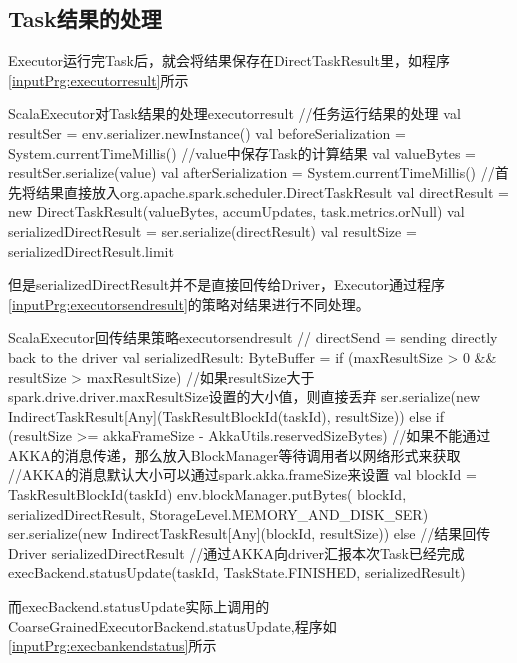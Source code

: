 \subsection{Task结果的处理}
Executor运行完Task后，就会将结果保存在DirectTaskResult里，如程序\ref{inputPrg:executorresult}所示
\begin{codeInput}{Scala}{Executor对Task结果的处理}{executorresult}
//任务运行结果的处理
val resultSer = env.serializer.newInstance()
val beforeSerialization = System.currentTimeMillis()
//value中保存Task的计算结果
val valueBytes = resultSer.serialize(value)
val afterSerialization = System.currentTimeMillis()
//首先将结果直接放入org.apache.spark.scheduler.DirectTaskResult
val directResult = new DirectTaskResult(valueBytes, accumUpdates, task.metrics.orNull)
val serializedDirectResult = ser.serialize(directResult)
val resultSize = serializedDirectResult.limit
\end{codeInput}

但是serializedDirectResult并不是直接回传给Driver，Executor通过程序\ref{inputPrg:executorsendresult}的策略对结果进行不同处理。
\begin{codeInput}{Scala}{Executor回传结果策略}{executorsendresult}
// directSend = sending directly back to the driver
val serializedResult: ByteBuffer = {
if (maxResultSize > 0 && resultSize > maxResultSize) {
  //如果resultSize大于spark.drive.driver.maxResultSize设置的大小值，则直接丢弃
  ser.serialize(new IndirectTaskResult[Any](TaskResultBlockId(taskId), resultSize))
} else if (resultSize >= akkaFrameSize - AkkaUtils.reservedSizeBytes) {
  //如果不能通过AKKA的消息传递，那么放入BlockManager等待调用者以网络形式来获取
  //AKKA的消息默认大小可以通过spark.akka.frameSize来设置
  val blockId = TaskResultBlockId(taskId)
  env.blockManager.putBytes(
  blockId, serializedDirectResult, StorageLevel.MEMORY_AND_DISK_SER)
  ser.serialize(new IndirectTaskResult[Any](blockId, resultSize))
} else {
  //结果回传Driver
  serializedDirectResult
 }
}
//通过AKKA向driver汇报本次Task已经完成
execBackend.statusUpdate(taskId, TaskState.FINISHED, serializedResult)
\end{codeInput}

而execBackend.statusUpdate实际上调用的CoarseGrainedExecutorBackend.statusUpdate,程序如\ref{inputPrg:execbankendstatus}所示

